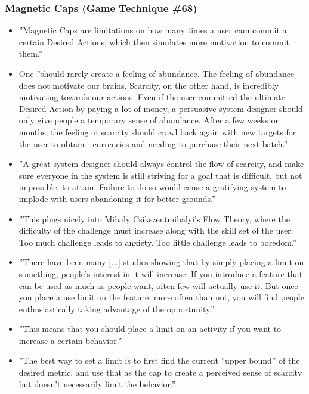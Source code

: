 \subsubsection{Magnetic Caps (Game Technique \#68)}
    \begin{itemize}
        \item ''Magnetic Caps are limitations on how many times a user cam commit a certain Desired Actions, which then simulates more motivation to commit them.''
        \item One ''should rarely create a feeling of abundance. The feeling of abundance does not motivate our brains. Scarcity, on the other hand, is incredibly motivating towards our actions. Even if the user committed the ultimate Desired Action by paying a lot of money, a persuasive system designer should only give people a temporary sense of abundance. After a few weeks or months, the feeling of scarcity should crawl back again with new targets for the user to obtain - currencies and needing to purchase their next batch.''
        \item ''A great system designer should always control the flow of scarcity, and make sure everyone in the system is still striving for a goal that is difficult, but not impossible, to attain. Failure to do so would cause a gratifying system to implode with users abandoning it for better grounds.''
        \item ''This plugs nicely into Mihaly Csikszentmihalyi's Flow Theory, where the difficulty of the challenge must increase along with the skill set of the user. Too much challenge leads to anxiety. Too little challenge leads to boredom.''
        \item ''There have been many [...] studies showing that by simply placing a limit on something, people's interest in it will increase. If you introduce a feature that can be used as much as people want, often few will actually use it. But once you place a use limit on the feature, more often than not, you will find people enthusiastically taking advantage of the opportunity.''
        \item ''This means that you should place a limit on an activity if you want to increase a certain behavior.''
        \item ''The best way to set a limit is to first find the current ''upper bound'' of the desired metric, and use that as the cap to create a perceived sense of scarcity but doesn't necessarily limit the behavior.''
    \end{itemize}
    
